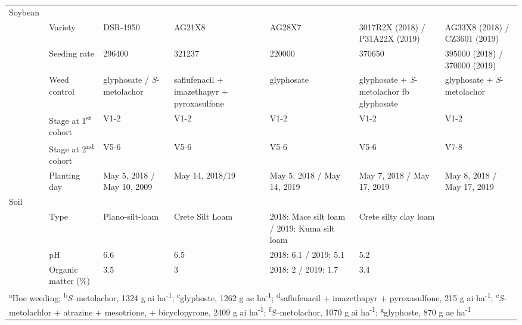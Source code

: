 \begin{table}[!h]
{\begin{tabular}[t]{lllllll}
Soybean &  &  &  &  &  & \\

 & Variety & DSR-1950 & AG21X8 & AG28X7 & 3017R2X (2018) / P31A22X (2019) & AG33X8 (2018) / CZ3601 (2019) \\

 & Seeding rate & 296400 & 321237 & 220000 & 370650 & 395000 (2018) / 370000 (2019) \\

 & Weed control & glyphosate / \emph{S}-metolachor & saflufenacil + imazethapyr + pyroxasulfone & glyphosate & glyphosate + \emph{S}-metolachor fb glyphosate & glyphosate + \emph{S}-metolachor \\

 & Stage at 1\textsuperscript{st} cohort & V1-2 & V1-2 & V1-2 & V1-2 & V1-2 \\

 & Stage at 2\textsuperscript{nd} cohort & V5-6 & V5-6 & V5-6 & V5-6 & V7-8\\

\multirow{-6}{*}{\raggedright\arraybackslash } & Planting day & May 5, 2018 / May 10, 2009 & May 14, 2018/19 & May 5, 2018 / May 14, 2019 & May 7, 2018 / May 17, 2019 & May 8, 2018 / May 17, 2019 \\

Soil &  &  &  &  &  & \\

 & Type & Plano-silt-loam & Crete Silt Loam & 2018: Mace silt loam / 2019: Kuma silt loam & Crete silty clay loam & \\

 & pH & 6.6 & 6.5 & 2018: 6.1 / 2019: 5.1 & 5.2 & \\

\multirow{-4}{*}{\raggedright\arraybackslash } & Organic matter (\%) & 3.5 & 3 & 2018: 2 / 2019: 1.7 & 3.4 & \\
\bottomrule
\multicolumn{7}{l}{\rule{0pt}{1em}\textsuperscript{a}Hoe weeding; \textsuperscript{b}\emph{S}--metolachor, 1324 g ai ha\textsuperscript{-1}; \textsuperscript{c}glyphoste, 1262 g ae ha\textsuperscript{-1}; \textsuperscript{d}saflufenacil + imazethapyr + pyroxasulfone, 215 g ai ha\textsuperscript{-1}; \textsuperscript{e}\emph{S}-metolachlor + atrazine + mesotrione, + bicyclopyrone, 2409 g ai ha\textsuperscript{-1}; \textsuperscript{f}\emph{S}--metolachor, 1070 g ai ha\textsuperscript{-1}; \textsuperscript{g}glyphoste, 870 g ae ha\textsuperscript{-1}} \\
\end{tabular}}
\end{table}




